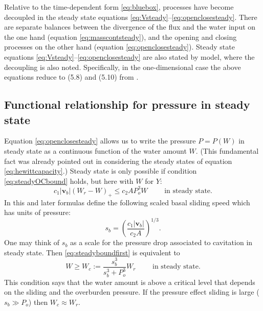 \documentclass[11pt,final]{amsart}
\newcommand\bv{\mathbf{v}}
\begin{document}
Relative to the time-dependent form \eqref{eq:bluebox}, processes have become decoupled in the steady state equations \eqref{eq:Vsteady}--\eqref{eq:openclosesteady}.  There are separate balances between the divergence of the flux and the water input on the one hand (equation \eqref{eq:masscontsteady}), and the opening and closing processes on the other hand (equation \eqref{eq:openclosesteady}).  Steady state equations \eqref{eq:Vsteady}--\eqref{eq:openclosesteady} are also stated by \cite{Schoofetal2012} model, where the decoupling is also noted.  Specifically, in the one-dimensional case the above equations reduce to (5.8) and (5.10) from \cite{Schoofetal2012}.

\subsection*{Functional relationship for pressure in steady state}  Equation \eqref{eq:openclosesteady} allows us to write the pressure $P=P(W)$ in steady state as a continuous function of the water amount $W$.  (This fundamental fact was already pointed out in considering the steady states of equation \eqref{eq:hewittcapacity}.)  Steady state is only possible if condition \eqref{eq:steadyOCbound} holds, but here with $W$ for $Y$:
\begin{equation}
c_1 |\bv_b| (W_r - W)_+ \le c_2 A P_o^3 W \qquad \text{ in steady state}. \label{eq:steadyboundfirst}
\end{equation}
In this and later formulas define the following scaled basal sliding speed which has units of pressure:
\begin{equation}
s_b =  \left(\frac{c_1 |\bv_b|}{c_2 A}\right)^{1/3}.  \label{eq:definesb}
\end{equation}
One may think of $s_b$ as a scale for the pressure drop associated to cavitation in steady state.  Then \eqref{eq:steadyboundfirst} is equivalent to
\begin{equation}
W \ge W_c := \frac{s_b^3}{s_b^3 + P_o^3} W_r  \qquad \text{ in steady state}. \label{eq:steadyboundsecond}
\end{equation}
This condition says that the water amount is above a critical level that depends on the sliding and the overburden pressure.  If the pressure effect sliding is large ($s_b \gg P_o$) then $W_c\approx W_r$.
\end{document}
